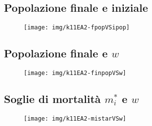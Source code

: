 \subsection{Popolazione finale e iniziale}


\begin{figure}[pbh]
    \centering
    \texttt{[image: img/k11EA2-fpopVSipop]}

    \caption[Experiment A2:2]{}

    \label{img:kh11expA22}
\end{figure}

\subsection{Popolazione finale e $w$}
\begin{figure}[pbh]
    \centering
    \texttt{[image: img/k11EA2-finpopVSw]}

    \caption[Experiment A2:3]{}

    \label{img:kh11expA23}
\end{figure}

\subsection{Soglie di mortalità $m_i^*$ e $w$}
\begin{figure}[pbh]
    \centering
    \texttt{[image: img/k11EA2-mistarVSw]}

    \caption[Experiment A2:4]{}

    \label{img:kh11expA24}
\end{figure}
